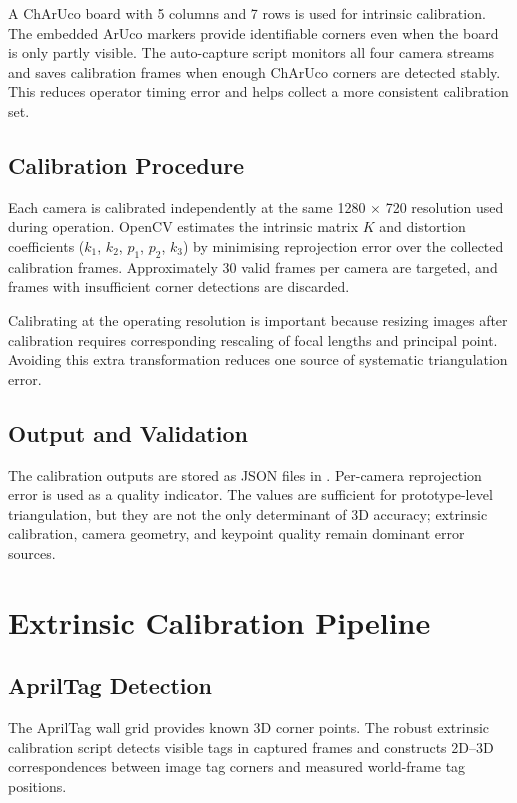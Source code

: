 A ChArUco board with 5 columns and 7 rows is used for intrinsic calibration. The embedded ArUco markers provide identifiable corners even when the board is only partly visible. The auto-capture script monitors all four camera streams and saves calibration frames when enough ChArUco corners are detected stably. This reduces operator timing error and helps collect a more consistent calibration set.

\subsection{Calibration Procedure}

Each camera is calibrated independently at the same 1280 $\times$ 720 resolution used during operation. OpenCV \cite{ref27} estimates the intrinsic matrix $K$ and distortion coefficients ($k_1$, $k_2$, $p_1$, $p_2$, $k_3$) by minimising reprojection error over the collected calibration frames. Approximately 30 valid frames per camera are targeted, and frames with insufficient corner detections are discarded.

Calibrating at the operating resolution is important because resizing images after calibration requires corresponding rescaling of focal lengths and principal point. Avoiding this extra transformation reduces one source of systematic triangulation error.

\subsection{Output and Validation}

The calibration outputs are stored as JSON files in . Per-camera reprojection error is used as a quality indicator. The values are sufficient for prototype-level triangulation, but they are not the only determinant of 3D accuracy; extrinsic calibration, camera geometry, and keypoint quality remain dominant error sources.

\section{Extrinsic Calibration Pipeline}

\subsection{AprilTag Detection}

The AprilTag wall grid provides known 3D corner points. The robust extrinsic calibration script detects visible tags in captured frames and constructs 2D--3D correspondences between image tag corners and measured world-frame tag positions.


